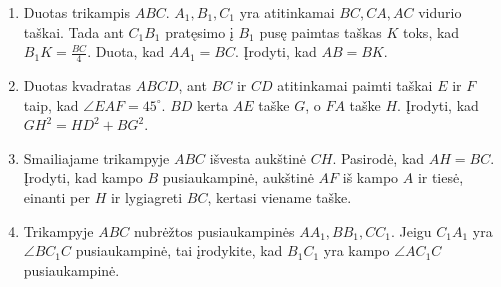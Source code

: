 \begin{enumerate}
\item Duotas trikampis $ABC$. $A_1, B_1, C_1$ yra atitinkamai $BC, CA, AC$
  vidurio taškai. Tada ant $C_1 B_1$ pratęsimo į $B_1$ pusę paimtas taškas
  $K$ toks, kad $B_1 K = \frac{BC}{4}$. Duota, kad  $AA_1 = BC$. Įrodyti,
  kad $AB = BK$.
\item Duotas kvadratas $ABCD$, ant $BC$ ir $CD$ atitinkamai paimti taškai 
  $E$ ir $F$ taip, kad $\angle EAF=45^\circ$. $BD$ kerta $AE$ taške $G$, o
  $FA$ taške $H$. Įrodyti, kad $GH^2=HD^2+BG^2$.
\item Smailiajame trikampyje $ABC$ išvesta aukštinė $CH$.  Pasirodė, kad
  $AH = BC$. Įrodyti, kad kampo $B$ pusiaukampinė, aukštinė $AF$ iš kampo
  $A$ ir tiesė, einanti per $H$ ir lygiagreti $BC$, kertasi viename taške.
\item Trikampyje $ABC$ nubrėžtos pusiaukampinės $AA_1, BB_1, CC_1$. Jeigu
  $C_1A_1$ yra $\angle BC_1C$ pusiaukampinė, tai įrodykite, kad $B_1C_1$
  yra kampo $\angle AC_1C$ pusiaukampinė.

\end{enumerate}
